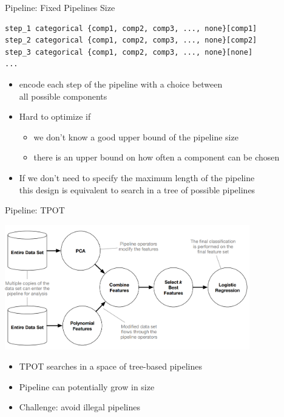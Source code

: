 \begin{frame}[c, fragile]{Pipeline: Fixed Pipelines Size}


\begin{verbatim}
step_1 categorical {comp1, comp2, comp3, ..., none}[comp1]
step_2 categorical {comp1, comp2, comp3, ..., none}[comp2]
step_3 categorical {comp1, comp2, comp3, ..., none}[none]
...
\end{verbatim}

\begin{itemize}
	\item encode each step of the pipeline with a choice between\\ all possible components
	\item Hard to optimize if
	\begin{itemize}
		\item we don't know a good upper bound of the pipeline size
		\item there is an upper bound on how often a component can be chosen
	\end{itemize}
    \pause
    \bigskip
	\item If we don't need to specify the maximum length of the pipeline\\ this design is equivalent to search in a tree of possible pipelines
\end{itemize}

\end{frame}
\begin{frame}[c]{Pipeline: TPOT }

\centering
\includegraphics[width=0.8\textwidth]{images/tpot_tree}

\begin{itemize}
  \item TPOT searches in a space of tree-based pipelines
  \item Pipeline can potentially grow in size
  \item Challenge: avoid illegal pipelines
\end{itemize}

\end{frame}
